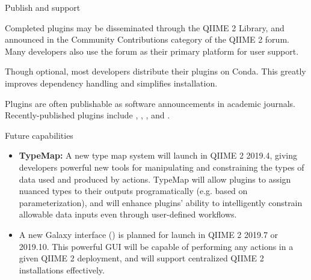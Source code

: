 \documentclass[final]{beamer}
\newlength{\colwidth}
\begin{document}
\begin{frame}[t]
\begin{columns}[t]
\begin{column}{\colwidth}
  \begin{block}{Publish and support}

    Completed plugins may be disseminated through the QIIME 2 Library, and announced
    in the Community Contributions category of the QIIME 2 forum. Many developers
    also use the forum as their primary platform for user support.

    Though optional, most developers distribute their plugins on Conda. This greatly
    improves dependency handling and simplifies installation.

    Plugins are often publishable as software announcements in academic journals.
    Recently-published plugins include \cite{Gibbons1006102},
    \cite{Rivers15704-1}, \cite{Martinoe00016-19}, and \cite{Kaehler406611}.

  \end{block}

  \begin{block}{Future capabilities}

    \begin{itemize}
      \item \textbf{TypeMap:} A new type map system will launch in QIIME 2 2019.4,
      giving developers powerful new tools for manipulating and constraining the types of
      data used and produced by actions. TypeMap will allow plugins to assign
      nuanced types to their outputs programatically (e.g. based on parameterization),
      and will enhance plugins' ability to intelligently constrain allowable data inputs
      even through user-defined workflows.
      \item \textbf{} A new Galaxy interface ()
      is planned for launch in QIIME 2 2019.7 or 2019.10. This powerful GUI will
      be capable of performing any actions in a given QIIME 2 deployment, and
      will support centralized QIIME 2 installations effectively.
    \end{itemize}

  \end{block}


\end{column}
\end{columns}
\end{frame}
\end{document}
